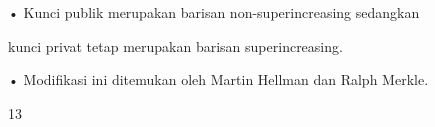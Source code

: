 \documentclass{article}
\begin{document}

• Kunci publik merupakan barisan non-superincreasing sedangkan 

kunci privat tetap merupakan barisan superincreasing. 

• Modifikasi ini ditemukan oleh Martin Hellman dan Ralph Merkle.

13
\end{document}
